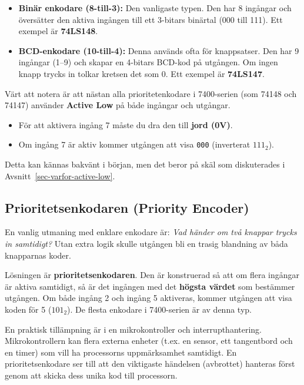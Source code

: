 \documentclass[
  swedish,
  letterpaper,
  oneside,
  openany]{book}
\providecommand{\tightlist}{%
  \setlength{\itemsep}{0pt}\setlength{\parskip}{0pt}}
\begin{document}
\begin{itemize}
\tightlist
\item
  \textbf{Binär enkodare (8-till-3):} Den vanligaste typen. Den har 8
  ingångar och översätter den aktiva ingången till ett 3-bitars binärtal
  (000 till 111). Ett exempel är \textbf{74LS148}.
\item
  \textbf{BCD-enkodare (10-till-4):} Denna används ofta för knappsatser.
  Den har 9 ingångar (1--9) och skapar en 4-bitars BCD-kod på utgången.
  Om ingen knapp trycks in tolkar kretsen det som 0. Ett exempel är
  \textbf{74LS147}.
\end{itemize}

Värt att notera är att nästan alla prioritetenkodare i 7400-serien (som
74148 och 74147) använder \textbf{Active Low} på både ingångar och
utgångar.

\begin{itemize}
\tightlist
\item
  För att aktivera ingång 7 måste du dra den till \textbf{jord (0V)}.
\item
  Om ingång 7 är aktiv kommer utgången att visa \texttt{000} (inverterat
  \(111_2\)).
\end{itemize}

Detta kan kännas bakvänt i början, men det beror på skäl som
diskuterades i Avsnitt~\ref{sec-varfor-active-low}.

\subsection{Prioritetsenkodaren (Priority
Encoder)}\label{prioritetsenkodaren-priority-encoder}

En vanlig utmaning med enklare enkodare är: \emph{Vad händer om två
knappar trycks in samtidigt?} Utan extra logik skulle utgången bli en
trasig blandning av båda knapparnas koder.

Lösningen är \textbf{prioritetsenkodaren}. Den är konstruerad så att om
flera ingångar är aktiva samtidigt, så är det ingången med det
\textbf{högsta värdet} som bestämmer utgången. Om både ingång 2 och
ingång 5 aktiveras, kommer utgången att visa koden för 5 (\(101_2\)). De
flesta enkodare i 7400-serien är av denna typ.

En praktisk tillämpning är i en mikrokontroller och interrupthantering.
Mikrokontrollern kan flera externa enheter (t.ex. en sensor, ett
tangentbord och en timer) som vill ha processorns uppmärksamhet
samtidigt. En prioritetsenkodare ser till att den viktigaste händelsen
(avbrottet) hanteras först genom att skicka dess unika kod till
processorn.
\end{document}
